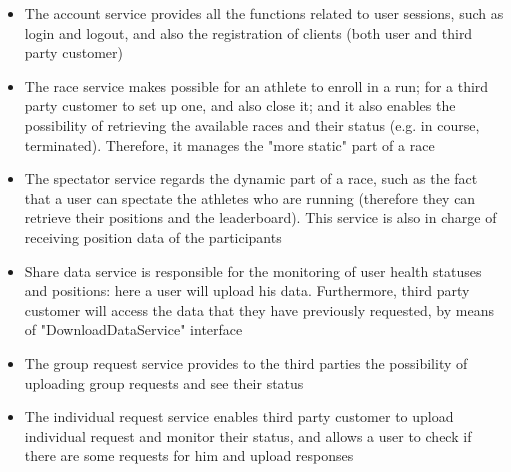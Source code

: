 \begin{itemize}
\item The account service provides all the functions related to user sessions, such as login and logout,
and also the registration of clients (both user and third party customer)
\item The race service makes possible for an athlete to enroll in a run; for a third party customer to set
up one, and also close it; and it also enables the possibility of retrieving the available races and their
status (e.g. in course, terminated). Therefore, it manages the "more static" part
of a race
\item The spectator service regards the dynamic part of a race, such as the fact that a user can spectate
the athletes who are running (therefore they can retrieve their positions and the leaderboard). This
service is also in charge of receiving position data of the participants
\item Share data service is responsible for the monitoring of user health statuses and positions: here a
user will upload his data. Furthermore, third party customer will access the data that they have
previously requested, by means of "DownloadDataService" interface
\item The group request service provides to the third parties the possibility of uploading group requests and see their status 
\item The individual request service enables third party customer to upload individual request and monitor their status, and allows a user to
check if there are some requests for him and upload responses 
\end{itemize}

